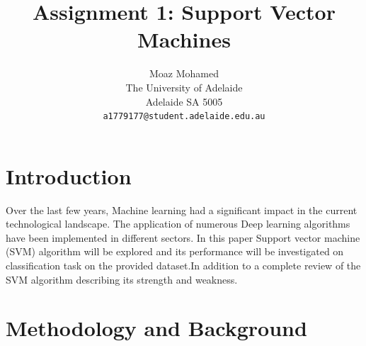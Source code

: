 \documentclass[10pt,onecolumn,letterpaper]{article}
\begin{document}
\title{Assignment 1: Support Vector Machines}

\author{Moaz Mohamed\\
The University of Adelaide\\
Adelaide SA 5005\\
{\tt\small a1779177@student.adelaide.edu.au}

}

\maketitle


\section{Introduction}

Over the last few years, Machine learning had a significant impact in the current technological landscape. 
The application of numerous Deep learning algorithms have been implemented in different sectors. In this paper Support vector machine (SVM) algorithm will be explored and its performance will be investigated on classification task on the provided dataset.In addition to a complete review of the SVM algorithm describing its strength and weakness.
\section{Methodology and Background}
\end{document}
